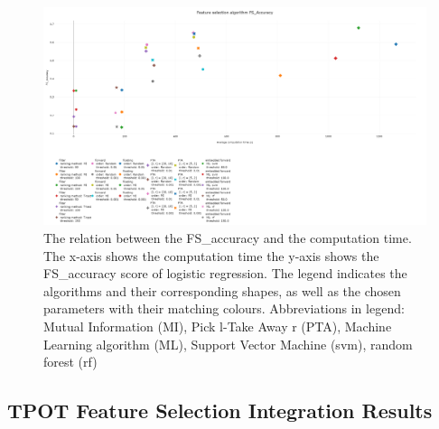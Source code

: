 \documentclass[10pt,a4paper]{article}
\begin{document}
\begin{figure}[H]
	\centering
	\includegraphics[angle=90,height=1.4\textwidth]{FS_Accuracy_99.png}
	\caption{The relation between the FS\_accuracy and the computation time. The x-axis shows the computation time the y-axis shows the FS\_accuracy score of logistic regression. The legend indicates the algorithms and their corresponding shapes, as well as the chosen parameters with their matching colours. Abbreviations in legend: Mutual Information (MI), Pick l-Take Away r (PTA), Machine Learning algorithm (ML), Support Vector Machine (svm), random forest (rf)}
	\label{fig:Comp_Time_FS_Acc}
\end{figure}
	
	\subsection{TPOT Feature Selection Integration Results}
	
\end{document}
